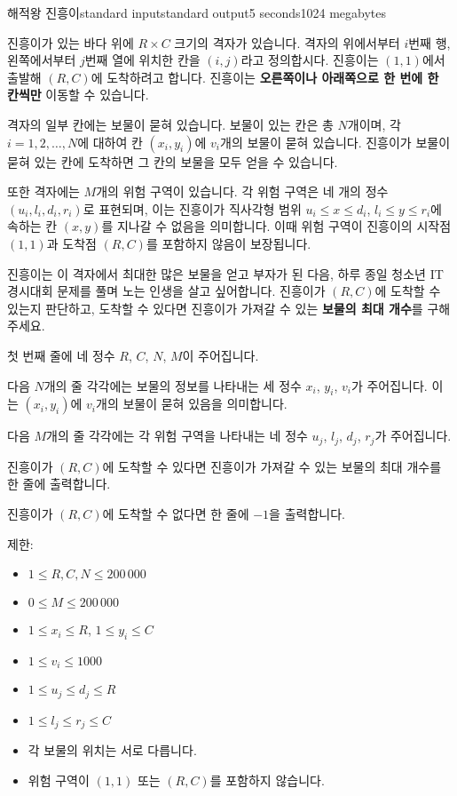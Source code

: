 \begin{problem}{해적왕 진흥이}{standard input}{standard output}{5 seconds}{1024 megabytes}

진흥이가 있는 바다 위에 $R \times C$ 크기의 격자가 있습니다. 격자의 위에서부터 $i$번째 행, 왼쪽에서부터 $j$번째 열에 위치한 칸을 $(i, j)$라고 정의합시다. 진흥이는 $(1, 1)$에서 출발해 $(R, C)$에 도착하려고 합니다. 진흥이는 \textbf{오른쪽이나 아래쪽으로 한 번에 한 칸씩만} 이동할 수 있습니다.

격자의 일부 칸에는 보물이 묻혀 있습니다. 보물이 있는 칸은 총 $N$개이며, 각 $i=1,2,\ldots,N$에 대하여 칸 $(x_i, y_i)$에 $v_i$개의 보물이 묻혀 있습니다. 진흥이가 보물이 묻혀 있는 칸에 도착하면 그 칸의 보물을 모두 얻을 수 있습니다. 

또한 격자에는 $M$개의 위험 구역이 있습니다. 각 위험 구역은 네 개의 정수 $(u_i, l_i, d_i, r_i)$로 표현되며, 이는 진흥이가 직사각형 범위 $u_i \le x \le d_i$, $l_i \le y \le r_i$에 속하는 칸 $(x, y)$를 지나갈 수 없음을 의미합니다. 이때 위험 구역이 진흥이의 시작점 $(1, 1)$과 도착점 $(R, C)$를 포함하지 않음이 보장됩니다. 

진흥이는 이 격자에서 최대한 많은 보물을 얻고 부자가 된 다음, 하루 종일 청소년 IT경시대회 문제를 풀며 노는 인생을 살고 싶어합니다. 진흥이가 $(R,C)$에 도착할 수 있는지 판단하고, 도착할 수 있다면 진흥이가 가져갈 수 있는 \textbf{보물의 최대 개수}를 구해 주세요.

\InputFile
첫 번째 줄에 네 정수 $R$, $C$, $N$, $M$이 주어집니다.

다음 $N$개의 줄 각각에는 보물의 정보를 나타내는 세 정수 $x_i$, $y_i$, $v_i$가 주어집니다. 이는 $(x_i, y_i)$에 $v_i$개의 보물이 묻혀 있음을 의미합니다.

다음 $M$개의 줄 각각에는 각 위험 구역을 나타내는 네 정수 $u_j$, $l_j$, $d_j$, $r_j$가 주어집니다.

\OutputFile
진흥이가 $(R,C)$에 도착할 수 있다면 진흥이가 가져갈 수 있는 보물의 최대 개수를 한 줄에 출력합니다.

진흥이가 $(R,C)$에 도착할 수 없다면 한 줄에 $-1$을 출력합니다.

\Scoring
제한:

\begin{itemize}
\item $1 \le R,C,N \le 200\,000$
\item $0 \le M \le 200\,000$
\item $1 \le x_i \le R$, $1 \le y_i \le C$
\item $1 \le v_i \le 1000$
\item $1 \le u_j \le d_j \le R$
\item $1 \le l_j \le r_j \le C$
\item 각 보물의 위치는 서로 다릅니다.
\item 위험 구역이 $(1, 1)$ 또는 $(R, C)$를 포함하지 않습니다.
\end{itemize}


\end{problem}
